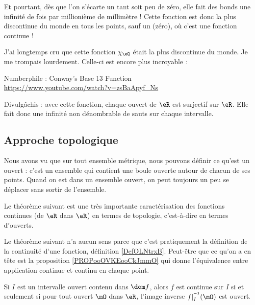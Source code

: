 Et pourtant, dès que l'on s'écarte un tant soit peu de zéro, elle fait des bonds une infinité de fois par millionième de millimètre ! Cette fonction est donc la plus discontinue du monde en tous les points, sauf un (zéro), où c'est une fonction continue !

\begin{normaltext}
	J'ai longtemps cru que cette fonction \( \chi_{\eQ}\) était la plus discontinue du monde. Je me trompais lourdement. Celle-ci est encore plus incroyable :
	\begin{center}
		Numberphile : Conway's Base 13 Function\\
		\url{https://www.youtube.com/watch?v=zsBaApyf_Ns}
	\end{center}
	Divulgâchis : avec cette fonction, chaque ouvert de \( \eR\) est surjectif sur \( \eR\). Elle fait donc une infinité non dénombrable de sauts sur chaque intervalle.
\end{normaltext}

\subsection{Approche topologique}

Nous avons vu que sur tout ensemble métrique, nous pouvons définir ce qu'est un ouvert : c'est un ensemble qui contient une boule ouverte autour de chacun de ses points. Quand on est dans un ensemble ouvert, on peut toujours un peu se déplacer sans sortir de l'ensemble.

Le théorème suivant est une très importante caractérisation des fonctions continues (de \( \eR\) dans \( \eR\)) en termes de topologie, c'est-à-dire en termes d'ouverts.

\begin{probleme}
	Le théorème suivant n'a aucun sens parce que c'est pratiquement la définition de la continuité d'une fonction, définition \ref{DefOLNtrxB}. Peut-être que ce qu'on a en tête est la proposition \ref{PROPooOVKEooCkJmmO} qui donne l'équivalence entre application continue et continu en chaque point.
\end{probleme}

\begin{theorem}     \label{ThoContInvOuvert}
	Si \( I\) est un intervalle ouvert contenu dans \( \dom f\), alors \( f\) est continue sur \( I\) si et seulement si pour tout ouvert \( \mO\) dans \( \eR\), l'image inverse \( f|_I^{^{-1}}(\mO)\) est ouvert.
\end{theorem}

